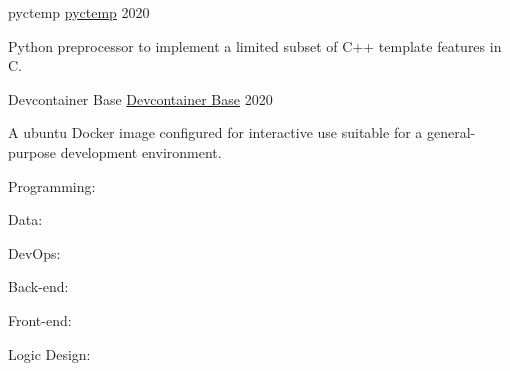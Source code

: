 \documentclass[11pt, a4paper]{cv}
\begin{document}
\begin{cv}
\begin{projects}
\begin{cventries}
\cventrycompact
{
{pyctemp}
{\color{hrefblue}\href{https://github.com/brandonmosher/pyctemp}{pyctemp}}}
{}
{}
{2020}
{\begin{cvparagraph}
Python preprocessor to implement a limited subset of C++ template features in C.
\end{cvparagraph}}
\cventrycompact
{
{Devcontainer Base}
{\color{hrefblue}\href{https://github.com/brandonmosher/devcontainer-base}{Devcontainer Base}}}
{}
{}
{2020}
{\begin{cvparagraph}
A ubuntu Docker image configured for interactive use suitable for a general-purpose development environment.
\end{cvparagraph}}
\end{cventries}
\end{projects}
\begin{skillsets}
\begin{cventries}
\titledItem
{Programming:}
{\begin{skills}
%
%
%
%
%
%
%
%
%
%
\end{skills}}
\par
\titledItem
{Data:}
{\begin{skills}
%
%
\end{skills}}
\par
\titledItem
{DevOps:}
{\begin{skills}
%
%
%
%
%
%
%
%
%
\end{skills}}
\par
\titledItem
{Back-end:}
{\begin{skills}
%
%
%
\end{skills}}
\par
\titledItem
{Front-end:}
{\begin{skills}
%
%
%
\end{skills}}
\par
\titledItem
{Logic Design:}
{\begin{skills}
%
%
%
\end{skills}}

\end{cventries}
\end{skillsets}
\end{cv}
\end{document}
